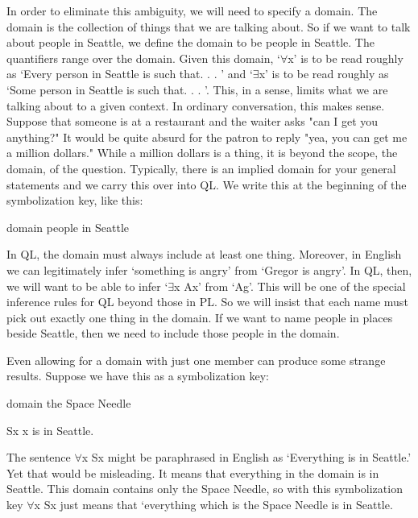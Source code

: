 In order to eliminate this ambiguity, we will need to specify a domain. The domain is the collection of things that we are talking about. So if we want to talk about people in Seattle, we define the domain to be people in Seattle. The quantifiers range over the domain. Given this domain, ‘$\forall$x’ is to be read roughly as ‘Every person in Seattle is such that. . . ’ and  ‘$\exists$x’ is to be read roughly as ‘Some person in Seattle is such that. . . ’. This, in a sense, limits what we are talking about to a given context. In ordinary conversation, this makes sense. Suppose that someone is at a restaurant and the waiter asks "can I get you anything?" It would be quite absurd for the patron to reply "yea, you can get me a million dollars." While a million dollars is a thing, it is beyond the scope, the domain, of the question. Typically, there is an implied domain for your general statements and we carry this over into QL. We write this at the beginning of the symbolization key, like this:
\begin{ekey}
\item[domain] people in Seattle
\end{ekey}
In QL, the domain must always include at least one thing. Moreover, in English we can legitimately infer ‘something is angry’ from ‘Gregor is angry’. In QL, then, we will want to be able to infer ‘$\exists$x Ax’ from ‘Ag’. This will be one of the special inference rules for QL beyond those in PL. So we will insist that each name must pick out exactly one thing in the domain. If we want to name people in places beside Seattle, then we need to include those people in the domain.

Even allowing for a domain with just one member can produce some strange results. Suppose we have this as a symbolization key:
\begin{ekey}
\item[domain] the Space Needle
\item[Sx] x is in Seattle.
\end{ekey}
The sentence $\forall$x Sx might be paraphrased in English as ‘Everything is in Seattle.’ Yet that would be misleading. It means that everything in the domain is in Seattle. This domain contains only the Space Needle, so with this symbolization key $\forall$x Sx just means that ‘everything which is the Space Needle is in Seattle.

